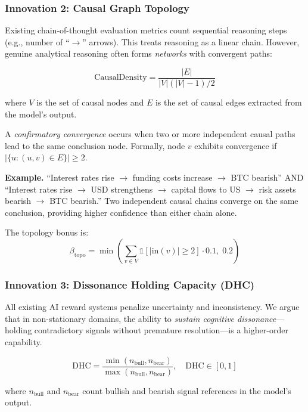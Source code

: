 \documentclass{article}
\begin{document}
\subsubsection{Innovation 2: Causal Graph Topology}
\label{sec:topology}

Existing chain-of-thought evaluation metrics count sequential reasoning steps (e.g., number of ``$\rightarrow$'' arrows). This treats reasoning as a linear chain. However, genuine analytical reasoning often forms \emph{networks} with convergent paths:

\begin{equation}
    \text{CausalDensity} = \frac{|E|}{|V|(|V|-1)/2}
\end{equation}

where $V$ is the set of causal nodes and $E$ is the set of causal edges extracted from the model's output.

\begin{definition}
A \emph{confirmatory convergence} occurs when two or more independent causal paths lead to the same conclusion node. Formally, node $v$ exhibits convergence if $|\{u : (u, v) \in E\}| \geq 2$.
\end{definition}

\textbf{Example.} ``Interest rates rise $\rightarrow$ funding costs increase $\rightarrow$ BTC bearish'' AND ``Interest rates rise $\rightarrow$ USD strengthens $\rightarrow$ capital flows to US $\rightarrow$ risk assets bearish $\rightarrow$ BTC bearish.'' Two independent causal chains converge on the same conclusion, providing higher confidence than either chain alone.

The topology bonus is:
\begin{equation}
    \beta_{\text{topo}} = \min\left(\sum_{v \in V} \mathbb{1}[|\text{in}(v)| \geq 2] \cdot 0.1, \; 0.2\right)
\end{equation}

\subsubsection{Innovation 3: Dissonance Holding Capacity (DHC)}

All existing AI reward systems penalize uncertainty and inconsistency. We argue that in non-stationary domains, the ability to \emph{sustain cognitive dissonance}---holding contradictory signals without premature resolution---is a higher-order capability.

\begin{definition}
\begin{equation}
    \text{DHC} = \frac{\min(n_{\text{bull}}, n_{\text{bear}})}{\max(n_{\text{bull}}, n_{\text{bear}})}, \quad \text{DHC} \in [0, 1]
\end{equation}

where $n_{\text{bull}}$ and $n_{\text{bear}}$ count bullish and bearish signal references in the model's output.
\end{definition}
\end{document}
